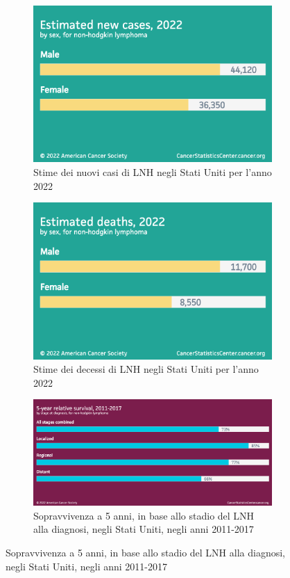 \begin{figure}[H]
    \begin{subfigure}[b]{0.4\textwidth}
            \includegraphics[width=\linewidth]{img/Estimatednewcases2022.png}
            \caption{Stime dei nuovi casi di LNH negli Stati Uniti per l’anno 2022}
            
    \end{subfigure}
    \begin{subfigure}[b]{0.4\textwidth}
            \includegraphics[width=\linewidth]{img/Estimateddeaths2022.png}
            \caption{Stime dei decessi di LNH negli Stati Uniti per l’anno 2022}
            
    \end{subfigure}

\begin{subfigure}[b]{0.7\textwidth}
    \includegraphics[width=\linewidth]{img/5-yearrelativesurvival2011-2017.png}
    \caption{Sopravvivenza a 5 anni, in base allo stadio del LNH alla diagnosi, negli Stati Uniti, negli anni 2011-2017}
    

\end{subfigure}
\end{figure}
